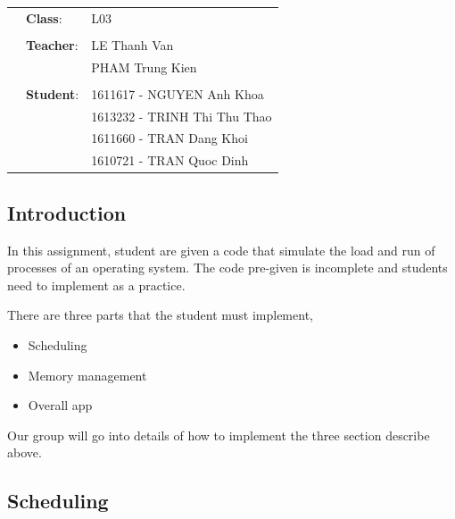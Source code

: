 \documentclass[]{article}
\providecommand{\tightlist}{%
  \setlength{\itemsep}{0pt}\setlength{\parskip}{0pt}}
\begin{document}
\begin{titlepage}
\begin{table}[h]
\begin{tabular}{rll}
\hspace{5cm} & \textbf{Class}: & L03 \\ \\
\hspace{5cm} & \textbf{Teacher}: & LE Thanh Van \\
& & PHAM Trung Kien \\ \\
\hspace{5cm} & \textbf{Student}: & 1611617 - NGUYEN Anh Khoa \\
& & 1613232 - TRINH Thi Thu Thao \\
& & 1611660 - TRAN Dang Khoi \\
& & 1610721 - TRAN Quoc Dinh \\
\end{tabular}
\end{table}
\vspace{-0.2cm}

\vspace{1cm}

\begin{center}
\end{center}
\end{titlepage}

\newpage
\thispagestyle{empty}
\tableofcontents
\newpage

\subsection{Introduction}\label{introduction}

In this assignment, student are given a code that simulate the load and
run of processes of an operating system. The code pre-given is
incomplete and students need to implement as a practice.

There are three parts that the student must implement,

\begin{itemize}
\tightlist
\item
  Scheduling
\item
  Memory management
\item
  Overall app
\end{itemize}

Our group will go into details of how to implement the three section
describe above.

\subsection{Scheduling}\label{scheduling}
\end{document}
